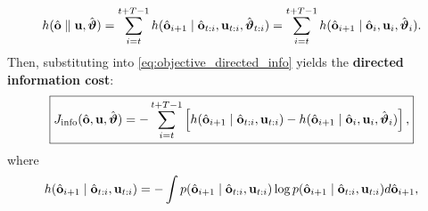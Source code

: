 \begin{equation}
        h(\hat{\mathbf{o}} \parallel \mathbf{u}, \hat{\boldsymbol{{\vartheta}}}) = \sum_{i=t}^{t+T-1} h(\hat{\mathbf{o}}_{i+1} \mid \hat{\mathbf{o}}_{
        t: i}, \mathbf{u}_{
        t: i}, \hat{\boldsymbol{{\vartheta}}}_{
        t: i})
        = \sum_{i=t}^{t+T-1} h(\hat{\mathbf{o}}_{i+1} \mid \hat{\mathbf{o}}_i, \mathbf{u}_i, \hat{\boldsymbol{{\vartheta}}}_i).
    \label{eq:obs_causal_entropy}
\end{equation}
Then, substituting into \eqref{eq:objective_directed_info} yields the \textbf{directed information cost}:
\begin{equation}
    \boxed{J_{\text{info}}(\hat{\mathbf{o}}, \mathbf{u}, \hat{\boldsymbol{{\vartheta}}}) = -\sum_{i=t}^{t+T-1} \left[ h(\hat{\mathbf{o}}_{i+1} \mid \hat{\mathbf{o}}_{t:i},\mathbf{u}_{t:i}) - h(\hat{\mathbf{o}}_{i+1} \mid \hat{\mathbf{o}}_i, \mathbf{u}_i, \hat{\boldsymbol{{\vartheta}}}_i)\right],}
    \label{eq:final_directed_cost}
\end{equation}
 where 
\begin{equation}
h(\hat{\mathbf{o}}_{i+1}\mid \hat{\mathbf{o}}_{t:i}, \mathbf{u}_{t:i}) = -\int p(\hat{\mathbf{o}}_{i+1} \mid \hat{\mathbf{o}}_{t:i}, \mathbf{u}_{t:i})\log p(\hat{\mathbf{o}}_{i+1} \mid \hat{\mathbf{o}}_{t:i}, \mathbf{u}_{t:i}) d \hat{\mathbf{o}}_{i + 1},
\end{equation}
